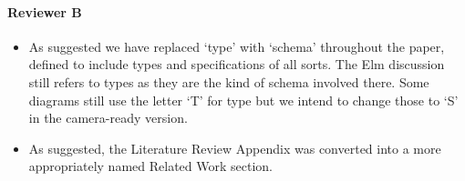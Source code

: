 \documentclass{article}
\begin{document}
\paragraph{Reviewer B}{}
\begin{itemize}

  \item As suggested we have replaced `type' with `schema' throughout the paper, defined to include types and specifications of all sorts. The Elm discussion still refers to types as they are the kind of schema involved there. Some diagrams still use the letter `T' for type but we intend to change those to `S' in the camera-ready version.





\item As suggested, the Literature Review Appendix was converted into a more appropriately named Related Work section.

\end{itemize}
\end{document}

